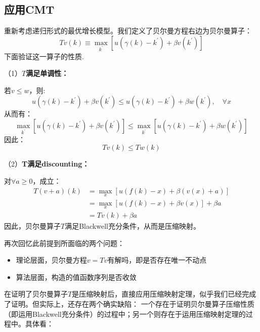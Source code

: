\subsection{应用CMT}

重新考虑递归形式的最优增长模型。我们定义了贝尔曼方程右边为贝尔曼算子：
\begin{equation*}
    Tv\left(k\right) \equiv \max_{k^{\prime}} \left[u\left(\gamma\left(k\right)-k^{\prime}\right)
        +\beta v\left(k^{\prime}\right)\right]
\end{equation*}
下面验证这一算子的性质.

（1）\textbf{$T$满足单调性：}

若$v \leq w$，则:
\begin{equation*}
    u\left(\gamma\left(k\right)-k^{\prime}\right)+\beta v\left(k^{\prime}\right) \leq 
        u\left(\gamma\left(k\right)-k^{\prime}\right)+\beta w\left(k^{\prime}\right), \quad \forall x
\end{equation*}
从而有：
\begin{equation*}
    \max _{k^{\prime}}\left[u\left(\gamma\left(k\right)-k^{\prime}\right)+\beta v\left(k^{\prime}\right)\right] \leq 
    \max _{k^{\prime}}\left[u\left(\gamma\left(k\right)-k^{\prime}\right)+\beta w\left(k^{\prime}\right)\right]
\end{equation*}
因此：
$$Tv\left(k\right)\leq Tw\left(k\right)$$

（2）\textbf{T满足discounting：}

对$\forall a \geq 0$，成立：
\begin{equation*}
    \begin{aligned}
        T(v+a)(k) & =\max _x[u(f(k)-x)+\beta(v(x)+a)] \\
            & =\max _x[u(f(k)-x)+\beta v(x)]+\beta a \\
            & =T v(k)+\beta a
    \end{aligned}
\end{equation*}
因此，贝尔曼算子$T$满足Blackwell充分条件，从而是压缩映射。

再次回忆此前提到所面临的两个问题：
\begin{itemize}
    \item 理论层面，贝尔曼方程$v=Tv$有解吗，即是否存在唯一不动点
    \item 算法层面，构造的值函数序列是否收敛
\end{itemize}

在证明了贝尔曼算子$T$是压缩映射后，直接应用压缩映射定理，似乎我们已经完成了证明。但实际上，还存在两个确实缺陷：
一个存在于证明贝尔曼算子压缩性质（即运用Blackwell充分条件）的过程中；另一个则存在于运用压缩映射定理的过程中。具体看：

